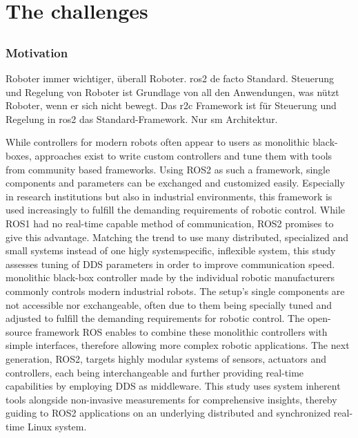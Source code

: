 \part{The challenges}
\chapter{}
\label{sec:Introduction}
\section{Motivation}
Roboter immer wichtiger, überall Roboter. \gls{ros2} de facto Standard. Steuerung und Regelung von Roboter ist Grundlage von all den Anwendungen, was nützt Roboter, wenn er sich nicht bewegt. Das \gls{r2c} Framework ist für Steuerung und Regelung in \gls{ros2} das Standard-Framework. Nur \gls{sm} Architektur. 

While controllers for modern robots often appear to users as monolithic black-boxes, approaches exist to write custom controllers and tune them with tools from community based frameworks. Using ROS2 as such a framework, single components and parameters can be exchanged and customized easily. Especially in research institutions but also in industrial environments, this framework is used increasingly to fulfill the demanding requirements of robotic control. While ROS1 had no real-time capable method of communication, ROS2 promises to give this advantage. Matching the trend to use many distributed, specialized and small systems instead of one higly systemspecific, inflexible system, this study assesses tuning of DDS parameters in order to improve communication speed. \cite{plasberg_towards_2022} \newline
monolithic black-box controller made by the individual robotic manufacturers commonly controls modern industrial robots. The setup’s single components are not accessible nor exchangeable, often due to them being specially tuned and adjusted to fulfill the demanding requirements for robotic control. The open-source framework ROS enables to combine these monolithic controllers with simple interfaces, therefore allowing more complex robotic applications. The next generation, ROS2, targets highly modular systems of sensors, actuators and controllers, each being interchangeable and further providing real-time capabilities by employing DDS as middleware. This study uses system inherent tools alongside non-invasive measurements for comprehensive insights, thereby guiding to ROS2 applications on an underlying distributed and synchronized real-time Linux system.\cite{puck_distributed_2020}

